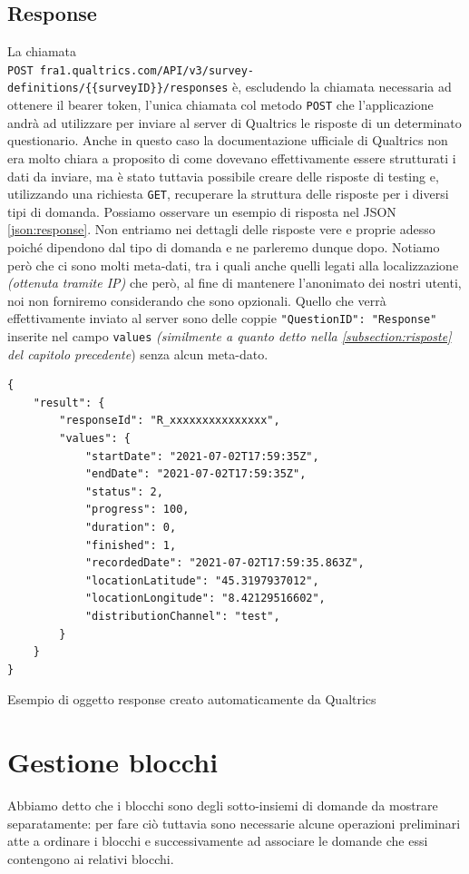 \subsection{Response}
La chiamata \\ \texttt{POST fra1.qualtrics.com/API/v3/survey-definitions/\{\{surveyID\}\}/responses} è, escludendo la chiamata necessaria ad ottenere il bearer token, l'unica chiamata col metodo \texttt{POST} che l'applicazione andrà ad utilizzare per inviare al server di Qualtrics le risposte di un determinato questionario.
Anche in questo caso la documentazione ufficiale di Qualtrics non era molto chiara a proposito di come dovevano effettivamente essere strutturati i dati da inviare, ma è stato tuttavia possibile creare delle risposte di testing e, utilizzando una richiesta \texttt{GET}, recuperare la struttura delle risposte per i diversi tipi di domanda. Possiamo osservare un esempio di risposta nel JSON \ref{json:response}. Non entriamo nei dettagli delle risposte vere e proprie adesso poiché dipendono dal tipo di domanda e ne parleremo dunque dopo. Notiamo però che ci sono molti meta-dati, tra i quali anche quelli legati alla localizzazione \textit{(ottenuta tramite IP)} che però, al fine di mantenere l'anonimato dei nostri utenti, noi non forniremo considerando che sono opzionali. Quello che verrà effettivamente inviato al server sono delle coppie \texttt{"QuestionID": "Response"} inserite nel campo \texttt{values} \textit{(similmente a quanto detto nella \autoref{subsection:risposte} del capitolo precedente}) senza alcun meta-dato.

\begin{json}
\begin{verbatim}
{
    "result": {
        "responseId": "R_xxxxxxxxxxxxxxx",
        "values": {
            "startDate": "2021-07-02T17:59:35Z",
            "endDate": "2021-07-02T17:59:35Z",
            "status": 2,
            "progress": 100,
            "duration": 0,
            "finished": 1,
            "recordedDate": "2021-07-02T17:59:35.863Z",
            "locationLatitude": "45.3197937012",
            "locationLongitude": "8.42129516602",
            "distributionChannel": "test",
        }
    }
}
\end{verbatim}
\caption{Esempio di oggetto response creato automaticamente da Qualtrics}
\label{json:response}
\end{json}

\newpage
\section{Gestione blocchi}
Abbiamo detto che i blocchi sono degli sotto-insiemi di domande da mostrare separatamente: per fare ciò tuttavia sono necessarie alcune operazioni preliminari atte a ordinare i blocchi e successivamente ad associare le domande che essi contengono ai relativi blocchi.

